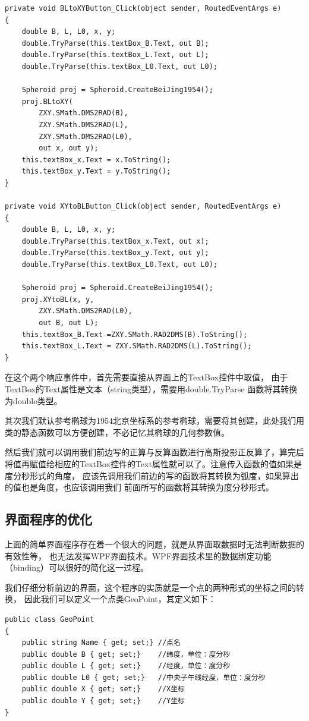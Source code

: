 \begin{lstlisting}
private void BLtoXYButton_Click(object sender, RoutedEventArgs e)
{
    double B, L, L0, x, y;
    double.TryParse(this.textBox_B.Text, out B);
    double.TryParse(this.textBox_L.Text, out L);
    double.TryParse(this.textBox_L0.Text, out L0);

    Spheroid proj = Spheroid.CreateBeiJing1954();
    proj.BLtoXY(
        ZXY.SMath.DMS2RAD(B),
        ZXY.SMath.DMS2RAD(L),
        ZXY.SMath.DMS2RAD(L0),
        out x, out y);
    this.textBox_x.Text = x.ToString();
    this.textBox_y.Text = y.ToString();
}

private void XYtoBLButton_Click(object sender, RoutedEventArgs e)
{
    double B, L, L0, x, y;
    double.TryParse(this.textBox_x.Text, out x);
    double.TryParse(this.textBox_y.Text, out y);
    double.TryParse(this.textBox_L0.Text, out L0);

    Spheroid proj = Spheroid.CreateBeiJing1954();
    proj.XYtoBL(x, y,
        ZXY.SMath.DMS2RAD(L0),
        out B, out L);
    this.textBox_B.Text =ZXY.SMath.RAD2DMS(B).ToString();
    this.textBox_L.Text = ZXY.SMath.RAD2DMS(L).ToString();
}
\end{lstlisting}

在这个两个响应事件中，首先需要直接从界面上的TextBox控件中取值，
由于TextBox的Text属性是文本（string类型），需要用double.TryParse
函数将其转换为double类型。

其次我们默认参考椭球为1954北京坐标系的参考椭球，需要将其创建，此处我们用
类的静态函数可以方便创建，不必记忆其椭球的几何参数值。

然后我们就可以调用我们前边写的正算与反算函数进行高斯投影正反算了，算完后
将值再赋值给相应的TextBox控件的Text属性就可以了。注意传入函数的值如果是度分秒形式的角度，
应该先调用我们前边的写的函数将其转换为弧度，如果算出的值也是角度，也应该调用我们
前面所写的函数将其转换为度分秒形式。


\subsection{界面程序的优化}
上面的简单界面程序存在着一个很大的问题，就是从界面取数据时无法判断数据的有效性等，
也无法发挥WPF界面技术。WPF界面技术里的数据绑定功能（binding）可以很好的简化这一过程。

我们仔细分析前边的界面，这个程序的实质就是一个点的两种形式的坐标之间的转换，
因此我们可以定义一个点类GeoPoint，其定义如下：

\begin{lstlisting}
public class GeoPoint
{
    public string Name { get; set;} //点名
    public double B { get; set;}    //纬度，单位：度分秒
    public double L { get; set;}    //经度，单位：度分秒
    public double L0 { get; set;}   //中央子午线经度，单位：度分秒
    public double X { get; set;}    //X坐标
    public double Y { get; set;}    //Y坐标
}
\end{lstlisting}

